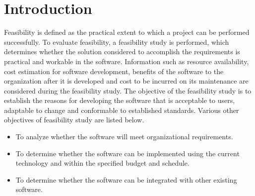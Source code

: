 \documentclass[fleqn,10pt]{../SelfArx} %
\affiliation{\textit{D-Enigma (Group - CS 01)}} %
\affiliation{\textit{Indian Institute of Information Technology, Vadodara.}} %
\begin{document}
\sffamily
\flushbottom %

\maketitle %

\tableofcontents %

\thispagestyle{empty} %


\section*{Introduction} %
Feasibility is defined as the practical extent to which a project can be performed successfully. To evaluate feasibility, a feasibility study is performed, which determines whether the solution considered to accomplish the requirements is practical and workable in the software. Information such as resource availability, cost estimation for software development, benefits of the software to the organization after it is developed and cost to be incurred on its maintenance are considered during the feasibility study. The objective of the feasibility study is to establish the reasons for developing the software that is acceptable to users, adaptable to change and conformable to established standards. Various other objectives of feasibility study are listed below.
\begin{itemize}

\item To analyze whether the software will meet organizational requirements.
\item To determine whether the software can be implemented using the current technology and within the specified budget and schedule.
\item To determine whether the software can be integrated with other existing software. \end{itemize}
\end{document}
